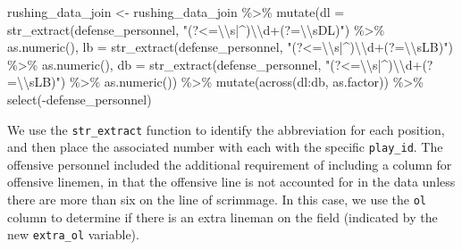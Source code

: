 \documentclass[
  letterpaper,
]{krantz}
\newenvironment{Shaded}{\begin{snugshade}}{\end{snugshade}}
\newcommand{\AttributeTok}[1]{\textcolor[rgb]{0.40,0.45,0.13}{#1}}
\newcommand{\FunctionTok}[1]{\textcolor[rgb]{0.28,0.35,0.67}{#1}}
\newcommand{\NormalTok}[1]{\textcolor[rgb]{0.00,0.23,0.31}{#1}}
\newcommand{\OtherTok}[1]{\textcolor[rgb]{0.00,0.23,0.31}{#1}}
\newcommand{\SpecialCharTok}[1]{\textcolor[rgb]{0.37,0.37,0.37}{#1}}
\newcommand{\StringTok}[1]{\textcolor[rgb]{0.13,0.47,0.30}{#1}}
\begin{document}
\begin{Shaded}
\begin{Highlighting}[]
\NormalTok{rushing\_data\_join }\OtherTok{\textless{}{-}}\NormalTok{ rushing\_data\_join }\SpecialCharTok{\%\textgreater{}\%}
  \FunctionTok{mutate}\NormalTok{(}\AttributeTok{dl =} \FunctionTok{str\_extract}\NormalTok{(defense\_personnel,}
                          \StringTok{"(?\textless{}=}\SpecialCharTok{\textbackslash{}\textbackslash{}}\StringTok{s|\^{})}\SpecialCharTok{\textbackslash{}\textbackslash{}}\StringTok{d+(?=}\SpecialCharTok{\textbackslash{}\textbackslash{}}\StringTok{sDL)"}\NormalTok{) }\SpecialCharTok{\%\textgreater{}\%} \FunctionTok{as.numeric}\NormalTok{(),}
         \AttributeTok{lb =} \FunctionTok{str\_extract}\NormalTok{(defense\_personnel,}
                          \StringTok{"(?\textless{}=}\SpecialCharTok{\textbackslash{}\textbackslash{}}\StringTok{s|\^{})}\SpecialCharTok{\textbackslash{}\textbackslash{}}\StringTok{d+(?=}\SpecialCharTok{\textbackslash{}\textbackslash{}}\StringTok{sLB)"}\NormalTok{) }\SpecialCharTok{\%\textgreater{}\%} \FunctionTok{as.numeric}\NormalTok{(),}
         \AttributeTok{db =} \FunctionTok{str\_extract}\NormalTok{(defense\_personnel,}
                          \StringTok{"(?\textless{}=}\SpecialCharTok{\textbackslash{}\textbackslash{}}\StringTok{s|\^{})}\SpecialCharTok{\textbackslash{}\textbackslash{}}\StringTok{d+(?=}\SpecialCharTok{\textbackslash{}\textbackslash{}}\StringTok{sLB)"}\NormalTok{) }\SpecialCharTok{\%\textgreater{}\%} \FunctionTok{as.numeric}\NormalTok{()) }\SpecialCharTok{\%\textgreater{}\%}
  \FunctionTok{mutate}\NormalTok{(}\FunctionTok{across}\NormalTok{(dl}\SpecialCharTok{:}\NormalTok{db, as.factor)) }\SpecialCharTok{\%\textgreater{}\%}
  \FunctionTok{select}\NormalTok{(}\SpecialCharTok{{-}}\NormalTok{defense\_personnel)}
\end{Highlighting}
\end{Shaded}

We use the \texttt{str\_extract} function to identify the abbreviation
for each position, and then place the associated number with each with
the specific \texttt{play\_id}. The offensive personnel included the
additional requirement of including a column for offensive linemen, in
that the offensive line is not accounted for in the data unless there
are more than six on the line of scrimmage. In this case, we use the
\texttt{ol} column to determine if there is an extra lineman on the
field (indicated by the new \texttt{extra\_ol} variable).
\end{document}
